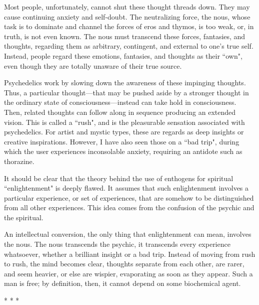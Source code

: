 Most people, unfortunately, cannot shut these thought threads down. They may cause continuing anxiety and self-doubt. The neutralizing force, the nous, whose task is to dominate and channel the forces of eros and thymos, is too weak, or, in truth, is not even known. The nous must transcend these forces, fantasies, and thoughts, regarding them as arbitrary, contingent, and external to one's true self. Instead, people regard these emotions, fantasies, and thoughts as their ``own", even though they are totally unaware of their true source.

Psychedelics work by slowing down the awareness of these impinging thoughts. Thus, a particular thought—that may be pushed aside by a stronger thought in the ordinary state of consciousness—instead can take hold in consciousness. Then, related thoughts can follow along in sequence producing an extended vision. This is called a ``rush", and is the pleasurable sensation associated with psychedelics. For artist and mystic types, these are regards as deep insights or creative inspirations. However, I have also seen those on a ``bad trip", during which the user experiences inconsolable anxiety, requiring an antidote such as thorazine.

\begin{quotex}
It should be clear that the theory behind the use of enthogens for spiritual ``enlightenment" is deeply flawed. It assumes that such enlightenment involves a particular experience, or set of experiences, that are somehow to be distinguished from all other experiences. This idea comes from the confusion of the psychic and the spiritual. 

\end{quotex}
An intellectual conversion, the only thing that enlightenment can mean, involves the nous. The nous transcends the psychic, it transcends every experience whatsoever, whether a brilliant insight or a bad trip. Instead of moving from rush to rush, the mind becomes clear, thoughts separate from each other, are rarer, and seem heavier, or else are wispier, evaporating as soon as they appear. Such a man is free; by definition, then, it cannot depend on some biochemical agent.




\begin{center}* * *\end{center}

